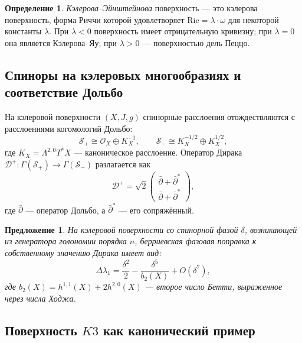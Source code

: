 \documentclass[12pt,a4paper]{article}
\newtheorem{proposition}[theorem]{Предложение}
\theoremstyle{definition}
\newtheorem{definition}[theorem]{Определение}
\theoremstyle{remark}
\newcommand{\cD}{\mathcal{D}}
\newcommand{\cS}{\mathcal{S}}
\newcommand{\cO}{\mathcal{O}}
\newcommand{\Ric}{\mathrm{Ric}}
\begin{document}
\begin{definition}
\emph{Кэлерова--Эйнштейнова} поверхность --- это кэлерова поверхность, форма Риччи которой удовлетворяет $\Ric = \lambda \cdot \omega$ для некоторой константы $\lambda$. При $\lambda < 0$ поверхность имеет отрицательную кривизну; при $\lambda = 0$ она является Кэлерова--Яу; при $\lambda > 0$ --- поверхностью дель Пеццо.
\end{definition}

\subsection{Спиноры на кэлеровых многообразиях и соответствие Дольбо}

На кэлеровой поверхности $(X, J, g)$ спинорные расслоения отождествляются с расслоениями когомологий Дольбо:
\begin{equation}
\cS_+ \cong \cO_X \oplus K_X^{-1}, \qquad \cS_- \cong K_X^{-1/2} \oplus K_X^{1/2},
\end{equation}
где $K_X = \Lambda^{2,0} T^*X$ --- каноническое расслоение. Оператор Дирака $\cD^+ \colon \Gamma(\cS_+) \to \Gamma(\cS_-)$ разлагается как
\begin{equation}
\cD^+ = \sqrt{2} \begin{pmatrix} \bar\partial + \bar\partial^* \\ \bar\partial + \bar\partial^* \end{pmatrix},
\end{equation}
где $\bar\partial$ --- оператор Дольбо, а $\bar\partial^*$ --- его сопряжённый.

\begin{proposition}
\label{prop:kahler-spinor-ru}
На кэлеровой поверхности со спинорной фазой $\delta$, возникающей из генератора голономии порядка $n$, берриевская фазовая поправка к собственному значению Дирака имеет вид:
\begin{equation}
\Delta\lambda_1 = \frac{\delta^2}{2} - \frac{\delta^5}{b_2(X)} + O(\delta^7),
\end{equation}
где $b_2(X) = h^{1,1}(X) + 2h^{2,0}(X)$ --- второе число Бетти, выраженное через числа Ходжа.
\end{proposition}

\subsection{Поверхность $K3$ как канонический пример}
\end{document}
